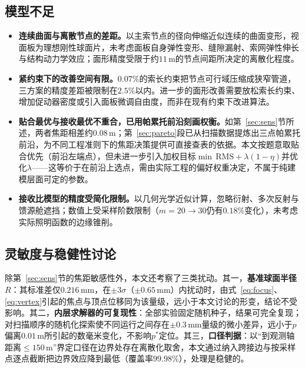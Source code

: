 \documentclass[withoutpreface]{cumcmthesis}
\begin{document}
\subsection{模型不足}

\begin{itemize}
\item \textbf{连续曲面与离散节点的差距。}以主索节点的径向伸缩近似连续的曲面变形，视面板为理想刚性球面片，未考虑面板自身弹性变形、缝隙漏射、索网弹性伸长与结构动力学效应；面形精度受限于约$11\,\mathrm{m}$的节点间距所决定的离散化程度。

\item \textbf{紧约束下的改善空间有限。}$0.07\%$的索长约束把节点可行域压缩成狭窄管道，三方案的精度差距被限制在$2.5\%$以内。进一步的面形改善需要放松索长约束、增加促动器密度或引入面板微调自由度，而非在现有约束下改进算法。

\item \textbf{贴合最优与接收最优不重合，已用帕累托前沿刻画权衡。}如第~\ref{sec:sens}节所述，两者焦距相差约$0.08\,\mathrm{m}$；第~\ref{sec:pareto}段已从扫描数据提炼出三点帕累托前沿，为不同工程准则下的焦距决策提供可直接查表的依据。本文按题意取贴合优先（前沿左端点），但未进一步引入加权目标$\min\,\mathrm{RMS}+\lambda(1-\eta)$并优化$\lambda$——这等价于在前沿上选点，需由实际工程的偏好权重决定，不属于纯建模层面可定的参数。

\item \textbf{接收比模型的精度受简化限制。}以几何光学近似计算，忽略衍射、多次反射与馈源舱遮挡；数值上受采样阶数限制（$m=20\to30$仍有$0.18\%$变化），未考虑实际照明函数的边缘锥削。
\end{itemize}

\subsection{灵敏度与稳健性讨论}

除第~\ref{sec:sens}节的焦距敏感性外，本文还考察了三类扰动。其一，\textbf{基准球面半径$R$}：其标准差仅$0.216\,\mathrm{mm}$，在$\pm3\sigma$（$\pm0.65\,\mathrm{mm}$）内扰动时，由式~\eqref{eq:focus}、\eqref{eq:vertex}引起的焦点与顶点位移同为该量级，远小于本文讨论的形变，结论不受影响。其二，\textbf{内层求解器的可复现性}：全部实验固定随机种子，结果可完全复现；对扫描顺序的随机化探索使不同运行之间存在$\pm0.3\,\mathrm{mm}$量级的微小差异，远小于$p$偏离$0.01\,\mathrm{m}$所引起的数毫米变化，不影响$p^{*}$定位。其三，\textbf{口径判据}：以``到观测轴距离$\le150\,\mathrm{m}$''界定口径在边界处存在离散化取舍，本文通过纳入跨接边与按采样点逐点截断把边界效应降到最低（覆盖率$99.98\%$），处理是稳健的。
\end{document}
